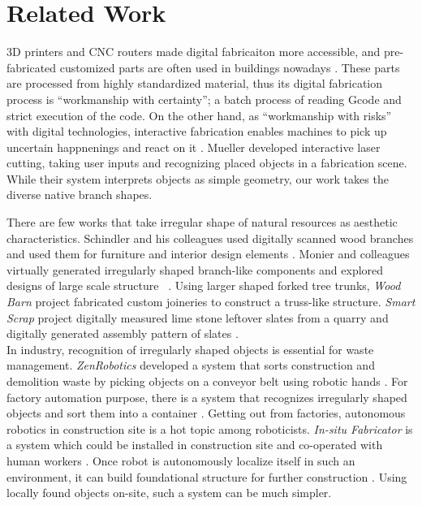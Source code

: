 \section{Related Work}
3D printers and CNC routers made digital fabricaiton more accessible, and pre-fabricated customized parts are often used in buildings nowadays \cite{knaack2012prefabricated}.
These parts are processed from highly standardized material, thus its digital fabrication process is ``workmanship with certainty''; a batch process of reading Gcode and strict execution of the code.
On the other hand, as ``workmanship with risks'' with digital technologies, interactive fabrication enables machines to pick up uncertain happnenings and react on it  \cite{willis2011interactive}.
Mueller developed interactive laser cutting, taking user inputs and recognizing placed objects in a fabrication scene\cite{Mueller:2012:ICI:2380116.2380191}.
While their system interprets objects as simple geometry, our work takes the diverse native branch shapes.

There are few works that take irregular shape of natural resources as aesthetic characteristics.
Schindler and his colleagues used digitally scanned wood branches and used them for furniture and interior design elements \cite{schindler2013serial}.
Monier and colleagues virtually generated irregularly shaped branch-like components and explored designs of large scale structure ~\cite{monier2013use}.
Using larger shaped forked tree trunks, \textit{Wood Barn} project fabricated custom joineries to construct a truss-like structure\cite{woodbarn}.
\textit{Smart Scrap} project digitally measured lime stone leftover slates from a quarry and digitally generated assembly pattern of slates \cite{smartscrap}.\\

In industry, recognition of irregularly shaped objects is essential for waste management.
\textit{ZenRobotics} developed a system that sorts construction and demolition waste by picking objects on a conveyor belt using robotic hands \cite{lukka2014zenrobotics}.
For factory automation purpose, there is a system that recognizes irregularly shaped objects and sort them into a container \cite{sujan2000design}.
Getting out from factories, autonomous robotics in construction site is a hot topic among roboticists\cite{feng2014towards}.
\textit{In-situ Fabricator} is a system which could be installed in construction site and co-operated with human workers \cite{dorfler2016mobile}.
Once robot is autonomously localize itself in such an environment, it can build foundational structure for further construction \cite{napp2014distributed}.
Using locally found objects on-site, such a system can be much simpler.\\

